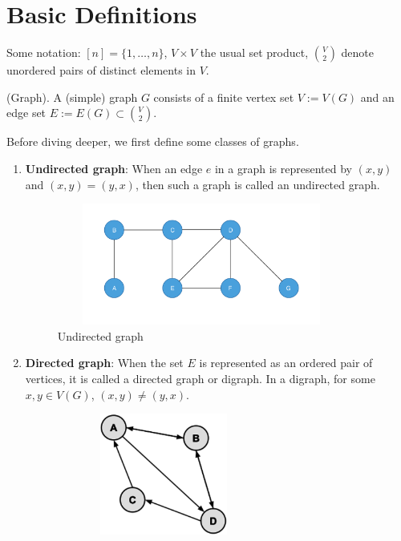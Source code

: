 \documentclass[../basic_graph_theory.tex]{subfiles}
\begin{document}
\chapter{Basic Definitions}
\setcounter{chapter}{1} %
\setcounter{section}{1}
\setcounter{equation}{1}
\setcounter{figure}{1}

Some notation: $[n] = \{1,\ldots,n\}$, $V \times V$ the usual set product, $\binom{V}{2}$ denote unordered pairs of distinct elements in $V$.
%
\begin{defn}(Graph).
    A (simple) graph $G$ consists of a finite vertex set $V := V(G)$ and an edge set $E := E(G) \subset \binom{V}{2}.$
\end{defn}
Before diving deeper, we first define some classes of graphs.
\begin{enumerate}
    \item \textbf{Undirected graph}: When an edge $e$ in a graph is represented by $(x,y)$ and $(x,y)=(y,x)$, then such a graph is called an undirected graph.
          \begin{figure}[hbt!]
              \centering
              \includegraphics[height=4cm, width=9.5cm]{../images/undirected.png}
              \caption{Undirected graph}
          \end{figure}
    \item \textbf{Directed graph}: When the set $E$ is represented as an ordered pair of vertices, it is called a directed graph or digraph. In a digraph, for some $x,y \in V(G)$, $(x,y) \neq (y,x)$.
          \begin{figure}[hbt!]
              \centering
              \includegraphics[height=4cm, width=7cm]{../images/directed.png}

\end{figure}
\end{enumerate}
\end{document}
